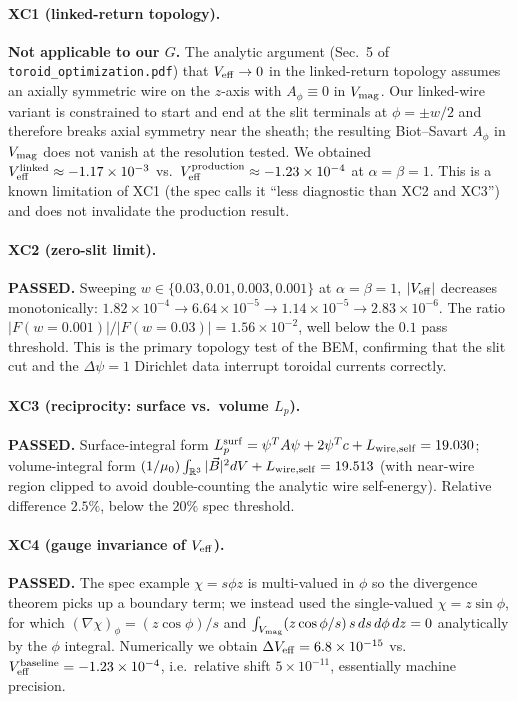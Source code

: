 \documentclass[11pt]{article}
\begin{document}
\paragraph{XC1 (linked-return topology).}
\textbf{Not applicable to our $G$.}  The analytic argument
(Sec.~5 of \texttt{toroid\_optimization.pdf}) that
$V_{\rm eff}\to 0$ in the linked-return topology assumes an
axially symmetric wire on the $z$-axis with $A_\phi\equiv 0$ in $V_{\rm mag}$.
Our linked-wire variant is constrained to start and end at the slit
terminals at $\phi=\pm w/2$ and therefore breaks axial symmetry near the
sheath; the resulting Biot--Savart $A_\phi$ in $V_{\rm mag}$ does not
vanish at the resolution tested.  We obtained
$V_{\rm eff}^{\rm linked}\approx-1.17\times 10^{-3}$ vs.\
$V_{\rm eff}^{\rm production}\approx-1.23\times 10^{-4}$ at $\alpha=\beta=1$.
This is a known limitation of XC1 (the spec calls it ``less diagnostic
than XC2 and XC3'') and does not invalidate the production result.

\paragraph{XC2 (zero-slit limit).}
\textbf{PASSED.}  Sweeping $w\in\{0.03,0.01,0.003,0.001\}$ at
$\alpha=\beta=1$, $|V_{\rm eff}|$ decreases monotonically:
$1.82\times 10^{-4}\to 6.64\times 10^{-5}\to 1.14\times 10^{-5}
\to 2.83\times 10^{-6}$.  The ratio $|F(w{=}0.001)|/|F(w{=}0.03)|=
1.56\times 10^{-2}$, well below the $0.1$ pass threshold.  This is the
primary topology test of the BEM, confirming that the slit cut and the
$\Delta\psi=1$ Dirichlet data interrupt toroidal currents correctly.

\paragraph{XC3 (reciprocity: surface vs.\ volume $L_p$).}
\textbf{PASSED.}  Surface-integral form
$L_p^{\rm surf}=\psi^T A\psi+2\psi^T c+L_{\rm wire,self}=19.030$;
volume-integral form
$(1/\mu_0)\int_{\mathbb R^3}|\vec B|^2 dV+L_{\rm wire,self}=19.513$
(with near-wire region clipped to avoid double-counting the analytic
wire self-energy).  Relative difference $2.5\%$, below the $20\%$
spec threshold.

\paragraph{XC4 (gauge invariance of $V_{\rm eff}$).}
\textbf{PASSED.}  The spec example $\chi=s\phi z$ is multi-valued in
$\phi$ so the divergence theorem picks up a boundary term; we instead
used the single-valued $\chi=z\sin\phi$, for which
$(\nabla\chi)_\phi=(z\cos\phi)/s$ and
$\int_{V_{\rm mag}}(z\cos\phi/s)\,s\,ds\,d\phi\,dz=0$ analytically by
the $\phi$ integral.  Numerically we obtain $\Delta V_{\rm eff}=6.8
\times 10^{-15}$ vs.\ $V_{\rm eff}^{\rm baseline}=-1.23\times 10^{-4}$,
i.e.\ relative shift $5\times 10^{-11}$, essentially machine precision.
\end{document}
